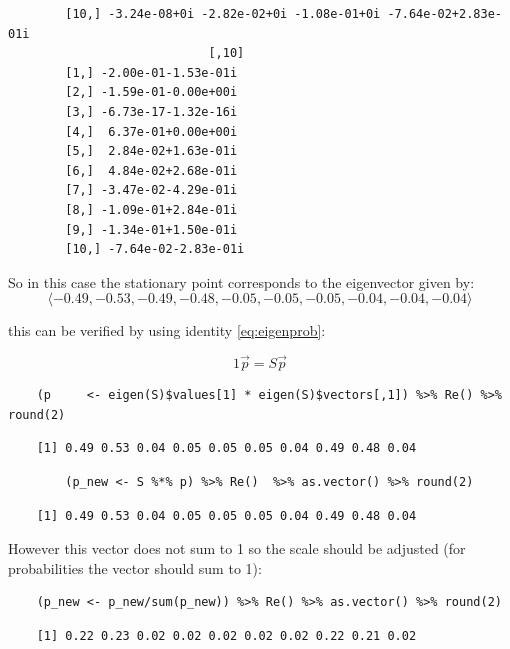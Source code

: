 \documentclass[11pt]{report}
\begin{document}
\begin{listing}[htbp]
\begin{tcolorbox}
\begin{verbatim}
        [10,] -3.24e-08+0i -2.82e-02+0i -1.08e-01+0i -7.64e-02+2.83e-01i
                            [,10]
        [1,] -2.00e-01-1.53e-01i
        [2,] -1.59e-01-0.00e+00i
        [3,] -6.73e-17-1.32e-16i
        [4,]  6.37e-01+0.00e+00i
        [5,]  2.84e-02+1.63e-01i
        [6,]  4.84e-02+2.68e-01i
        [7,] -3.47e-02-4.29e-01i
        [8,] -1.09e-01+2.84e-01i
        [9,] -1.34e-01+1.50e-01i
        [10,] -7.64e-02-2.83e-01i
        \end{verbatim}
    \end{tcolorbox}
\caption{\label{eigenSol-rand-surf}Solve the Eigen vectors and Eigen values of the transition probability matrix corresponding to the graph.}
\end{listing}



So in this case the stationary point corresponds to the eigenvector given by:
\[
\langle -0.49, -0.53, -0.49, -0.48, -0.05, -0.05, -0.05, -0.04, -0.04, -0.04 \rangle
\]

this can be verified by using identity \eqref{eq:eigenprob}:

$$
1 \vec{p} = S\vec{p}
$$

\begin{tcolorbox}
    \begin{verbatim}
    (p     <- eigen(S)$values[1] * eigen(S)$vectors[,1]) %>% Re() %>%  round(2)
    \end{verbatim}
\tcblower
    \begin{verbatim}
    [1] 0.49 0.53 0.04 0.05 0.05 0.05 0.04 0.49 0.48 0.04
    \end{verbatim}
\end{tcolorbox}

\begin{tcolorbox}
    \begin{verbatim}
        (p_new <- S %*% p) %>% Re()  %>% as.vector() %>% round(2)
    \end{verbatim}
 \tcblower
    \begin{verbatim}
    [1] 0.49 0.53 0.04 0.05 0.05 0.05 0.04 0.49 0.48 0.04
    \end{verbatim}
\end{tcolorbox}


However this vector does not sum to 1 so the scale should be adjusted
(for probabilities the vector should sum to 1):

\begin{tcolorbox}
    \begin{verbatim}
    (p_new <- p_new/sum(p_new)) %>% Re() %>% as.vector() %>% round(2)
    \end{verbatim}
\tcblower
    \begin{verbatim}
    [1] 0.22 0.23 0.02 0.02 0.02 0.02 0.02 0.22 0.21 0.02
    \end{verbatim}
\end{tcolorbox}
\end{document}
